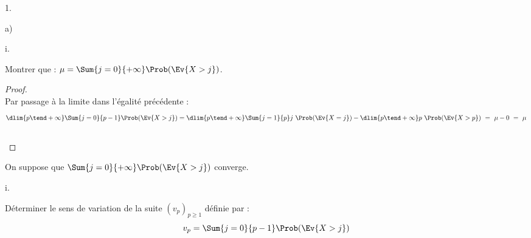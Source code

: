 \begin{noliste}{1.}
\begin{noliste}{a)}
\begin{nonoliste}{i.}
    \newpage


  \item Montrer que : $\mu= \Sum{j=0}{+\infty} \Prob(\Ev{X >j})$.

      \begin{proof}~\\
        Par passage à la limite dans l'égalité précédente :
        \[
        \dlim{p \tend +\infty} \Sum{j=0}{p-1} \Prob(\Ev{X > j}) =
        \dlim{p \tend +\infty} \Sum{j=1}{p} j \ \Prob(\Ev{X = j}) -
        \dlim{p \tend +\infty} p \ \Prob(\Ev{X > p}) \ = \ \mu - 0 \ =
        \ \mu
        \]
        ~\\[-1cm] 
      \end{proof}
    \end{nonoliste}
    
  \item On suppose que $\Sum{j=0}{+\infty} \Prob(\Ev{X >j})$ converge.
    \begin{nonoliste}{i.}
    \item Déterminer le sens de variation de la suite $(v_p)_{p \geq
        1}$ définie par :
      \[
      v_p= \Sum{j=0}{p-1} \Prob(\Ev{X >j})
      \]
      

\end{nonoliste}
\end{noliste}
\end{noliste}
